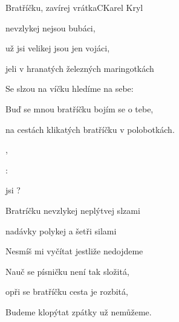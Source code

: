 \begin{song}{Bratříčku, zavírej vrátka}{C}{Karel Kryl}

\begin{SBVerse}

 nevzlykej  nejsou bubáci,

 už jsi velikej  jsou jen vojáci,

jeli v hranatých železných maringotkách

\end{SBVerse}

\begin{SBVerse}

Se slzou na víčku hledíme na sebe:

Buď se mnou bratříčku bojím se o tebe,

na cestách klikatých bratříčku v polobotkách.

\end{SBVerse}

\begin{SBChorus}

    

   ,

    :

 jsi  ?

\end{SBChorus}

\begin{SBVerse}

Bratríčku nevzlykej neplýtvej slzami

nadávky polykej a šetři silami

Nesmíš mi vyčítat jestliže nedojdeme

\end{SBVerse}

\begin{SBVerse}

Nauč se písničku není tak složitá,

opři se bratříčku cesta je rozbitá,

Budeme klopýtat zpátky už nemůžeme.

\end{SBVerse}

\begin{SBChorus}

\end{SBChorus}

\end{song}

\clearpage
